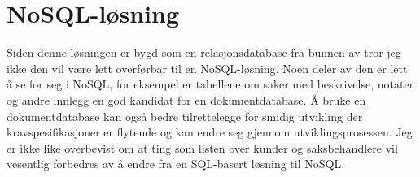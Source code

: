 \documentclass[]{article}
\begin{document}
    \section*{NoSQL-løsning}

    Siden denne løsningen er bygd som en relasjonsdatabase fra bunnen av tror jeg ikke den vil være lett overførbar til en NoSQL-løsning. Noen deler av den er lett å se for seg i NoSQL, for eksempel er tabellene om saker med beskrivelse, notater og andre innlegg en god kandidat for en dokumentdatabase. Å bruke en dokumentdatabase kan også bedre tilrettelegge for smidig utvikling der kravspesifikasjoner er flytende og kan endre seg gjennom utviklingsprosessen. Jeg er ikke like overbevist om at ting som listen over kunder og saksbehandlere vil vesentlig forbedres av å endre fra en SQL-basert løsning til NoSQL.
\end{document}
